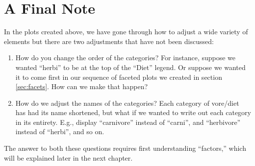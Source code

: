 \section{A Final Note}

In the plots created above, we have gone through how to adjust a wide variety of elements but there are two adjustments that have not been discussed:

\begin{enumerate}
    \item How do you change the order of the categories?  For instance, suppose we wanted ``herbi'' to be at the top of the ``Diet'' legend. Or suppose we wanted it to come first in our sequence of faceted plots we created in section \ref{sec:facets}. How can we make that happen?
    \item  How do we adjust the names of the categories? Each category of vore/diet has had its name shortened, but what if we wanted to write out each category in its entirety. E.g., display ``carnivore'' instead of ``carni'', and ``herbivore'' instead of ``herbi'', and so on.
\end{enumerate}

The answer to both these questions requires first understanding ``factors,'' which will be explained later in the next chapter.